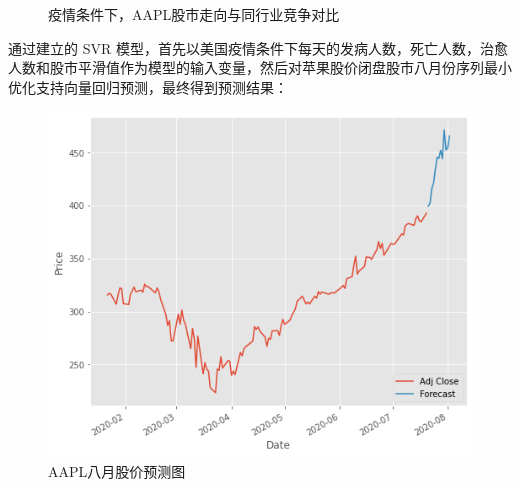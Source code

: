 \documentclass{whutmod}
\begin{document}
    \begin{figure}[H]
   	\centering
   	\caption{疫情条件下，AAPL股市走向与同行业竞争对比}        	\label{lssssddsssssdssct}
   \end{figure}

通过建立的 SVR 模型，首先以美国疫情条件下每天的发病人数，死亡人数，治愈人数和股市平滑值作为模型的输入变量，然后对苹果股价闭盘股市八月份序列最小优化支持向量回归预测，最终得到预测结果：
           \begin{figure}[H]
   	\centering
   	\includegraphics[width=.8\textwidth]{figures/A5.png}
   	\caption{AAPL八月股价预测图}
   \end{figure}
\end{document}
